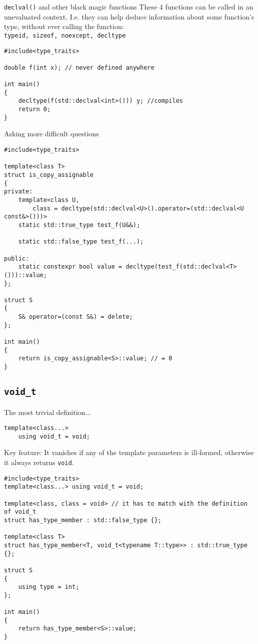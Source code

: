 \documentclass{beamer}
\begin{document}
\begin{frame}[fragile]{\texttt{declval()} and other black magic functions}
These 4 functions can be called in an unevaluated context. I.e. they can help deduce information about some function's type, without ever calling the function:\\
\texttt{typeid, sizeof, noexcept, decltype}
\begin{lstlisting}
#include<type_traits>

double f(int x); // never defined anywhere

int main()
{
	decltype(f(std::declval<int>())) y; //compiles
	return 0;
}
\end{lstlisting}
\end{frame}

\begin{frame}[fragile]{Asking more difficult questions}
\begin{lstlisting}
#include<type_traits>

template<class T>
struct is_copy_assignable
{
private:
	template<class U,
		class = decltype(std::declval<U>().operator=(std::declval<U const&>()))>
	static std::true_type test_f(U&&);
	
	static std::false_type test_f(...);

public:
	static constexpr bool value = decltype(test_f(std::declval<T>()))::value;
};

struct S
{
	S& operator=(const S&) = delete;
};

int main()
{
	return is_copy_assignable<S>::value; // = 0
}
\end{lstlisting}
\end{frame}

\subsection{\texttt{void\_t}}
\begin{frame}[fragile]{The most trivial definition...}
\begin{lstlisting}
template<class...>
	using void_t = void;
\end{lstlisting}
\pause
Key feature: It vanishes if any of the template parameters is ill-formed, otherwise it always returns \texttt{void}.
\begin{lstlisting}
#include<type_traits>
template<class...> using void_t = void;

template<class, class = void> // it has to match with the definition of void_t
struct has_type_member : std::false_type {};

template<class T>
struct has_type_member<T, void_t<typename T::type>> : std::true_type {};

struct S
{
	using type = int;
};

int main()
{
	return has_type_member<S>::value;
}
\end{lstlisting}
\end{frame}
\end{document}
